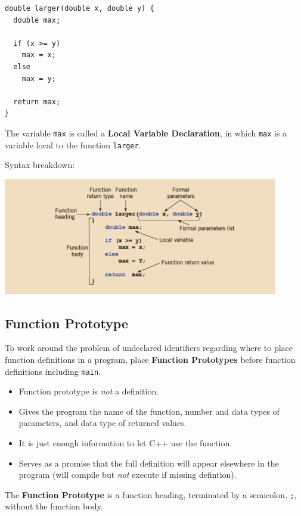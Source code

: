 \documentclass{article}
\begin{document}
\begin{lstlisting}[caption={Example program using \texttt{return}}]
double larger(double x, double y) {
  double max;

  if (x >= y)
    max = x;
  else
    max = y;

  return max;
}
\end{lstlisting}

The variable \texttt{max} is called a \textbf{Local Variable Declaration}, in
which \texttt{max} is a variable local to the function \texttt{larger}.

\vspace{8pt}
Syntax breakdown:
\begin{center}
    \includegraphics[width=0.9\textwidth]{larger-ret-func-ex.png}
\end{center}

\subsection{Function Prototype}
To work around the problem of undeclared identifiers regarding where to place
function definitions in a program, place \textbf{Function Prototypes} before
function definitions including \texttt{main}.
\begin{itemize}
  \item Function prototype is \textit{not} a definition.
  \item Gives the program the name of the function, number and data types of
    parameters, and data type of returned values.
  \item It is just enough information to let C++ use the function.
  \item Serves as a promise that the full definition will appear elsewhere in
    the program (will compile but \textit{not} execute if missing defintion).
\end{itemize}

The \textbf{Function Prototype} is a function heading, terminated by a
semicolon, \texttt{;}, without the function body.
\end{document}
